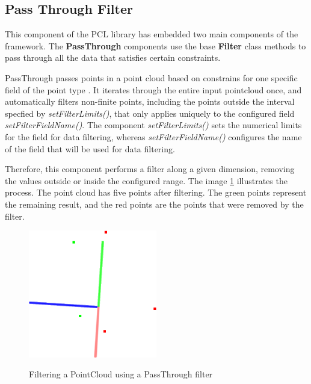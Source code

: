 \documentclass[12pt]{report}
\begin{document}
\subsection{Pass Through Filter}
\label{section:Pass Through Filter}
This component of the PCL library has embedded two main components of the framework. 
The \textbf{PassThrough} components use the base \textbf{Filter} class methods to pass through all the data that satisfies certain constraints.

PassThrough passes points in a point cloud based on constrains for one specific field of the point type .
It iterates through the entire input pointcloud once, and automatically filters non-finite points, including the points outside the interval specfied by \textit{setFilterLimits()}, 
that only applies uniquely to the configured field \textit{setFilterFieldName()}. 
The component \textit{setFilterLimits()} sets the numerical limits for the field for data filtering, whereas \textit{setFilterFieldName()} configures the name of the field that will be used for data filtering.

Therefore, this component performs a filter along a given dimension, removing the values outside or inside the configured range.
The image \ref{fig:pass_through} illustrates the process. The point cloud has five points after filtering. The green points represent the remaining result, and the red points are the points that were removed by the filter.

\begin{figure}[H]%
  \centering
  \includegraphics[width=0.5\textwidth]{passthrough_2.png}
 \caption{Filtering a PointCloud using a PassThrough filter}\cite[]{Rusu_ICRA2011_PCL}
 \label{fig:pass_through} 
\end{figure}
\end{document}
